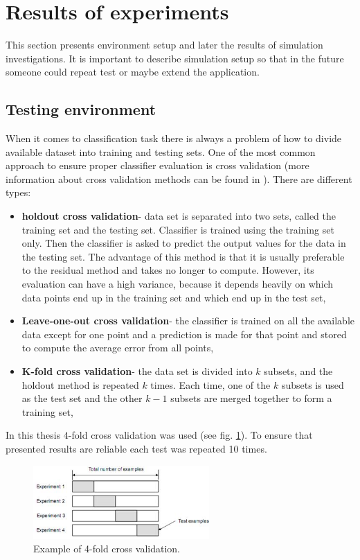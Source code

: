 \section{Results of experiments}
\label{cha:Simulation_investugations}
This section presents environment setup and later the results of simulation
investigations. It is important to describe simulation setup so that in the
future someone could repeat test or maybe extend the application.
\subsection{Testing environment}
When it comes to classification task there is always a problem of how to
divide available dataset into training and testing sets. One of the most common 
approach to ensure proper classifier evaluation is cross validation (more
information about cross validation methods can be found in \cite{bib41}). 
There are different types:
\begin{itemize}
    \item \textbf{holdout cross validation}- data set is separated into two sets, called the 
        training set and the testing set. Classifier is trained using the 
        training set only. Then the classifier is asked to predict the output 
        values for the data in the testing set. The advantage of this method is 
        that it is usually preferable to the residual method and takes no longer 
        to compute. However, its evaluation can have a high variance, because
        it depends heavily on which data points end up in the training set and 
        which end up in the test set,
    \item \textbf{Leave-one-out cross validation}- the classifier is trained on all the
        available data except for one point and a prediction is made for that
        point and stored to compute the average error from all points,
    \item \textbf{K-fold cross validation}- the data set is divided into $k$ subsets, 
        and the holdout method is repeated $k$ times. Each time, one of the $k$ subsets 
        is used as the test set and the other $k-1$ subsets are merged together to form 
        a training set,
\end{itemize}
In this thesis $4$-fold cross validation was used (see fig.
\ref{fig:cross_validation}). To ensure that presented
results are reliable each test was repeated 10 times.
\begin{figure}[H]
    \begin{center}
        \includegraphics[width=0.6\textwidth]{fig/cross_validation.jpg}
    \end{center}
    \caption{Example of 4-fold cross validation.}
    \label{fig:cross_validation}
\end{figure}
\label{cha:Simulation_environment}
